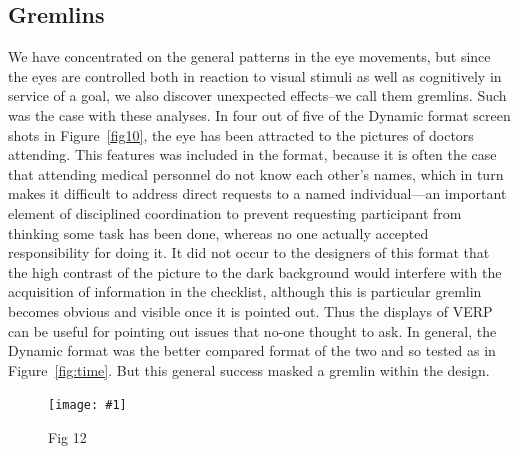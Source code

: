 \documentclass{sigchi}
\newcommand{\insertpicture}[2]{\begin{center}\texttt{[image: \#1]}\end{center}}
\begin{document}
\subsection{Gremlins} 
We have concentrated on the general patterns in the eye movements,
but since the eyes are controlled both in reaction to visual
stimuli as well as cognitively in service of a goal, we also
discover unexpected effects--we call them gremlins. Such was the case with these
analyses. In four out of five of the Dynamic format screen shots
in Figure~\ref{fig10}, the eye has been attracted to the pictures of doctors
attending. This features was included in the format, because it
is often the case that attending medical personnel do not know
each other’s names, which in turn makes it difficult to address
direct requests to a named individual—an important element of
disciplined coordination to prevent requesting participant from
thinking some task has been done, whereas no one actually
accepted responsibility for doing it. It did not occur to the
designers of this format that the high contrast of the picture to
the dark background would interfere with the acquisition of
information in the checklist, although this is particular gremlin becomes obvious and visible  once it is
pointed out. Thus the displays of VERP can be useful for pointing
out issues that no-one thought to ask. In general, the Dynamic
format was the better compared format of the two and so tested as in Figure~\ref{fig:time}. But 
this general success masked a gremlin within the design.

\begin{figure}
	\insertpicture{figures/dummy.eps}{0.5}
	\caption{Fig 12\label{fig12}}
\end{figure}


					
\end{document}
